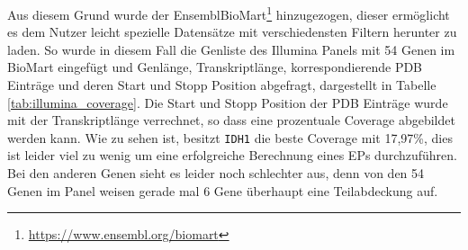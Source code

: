 Aus diesem Grund wurde der EnsemblBioMart\footnote{\url{https://www.ensembl.org/biomart}} hinzugezogen, dieser ermöglicht es dem Nutzer leicht spezielle Datensätze mit verschiedensten Filtern herunter zu laden. So wurde in diesem Fall die Genliste des Illumina Panels mit 54 Genen im BioMart eingefügt und Genlänge, Transkriptlänge, korrespondierende \ac{PDB} Einträge und deren Start und Stopp Position abgefragt, dargestellt in Tabelle \ref{tab:illumina_coverage}. Die Start und Stopp Position der \ac{PDB} Einträge wurde mit der Transkriptlänge verrechnet, so dass eine prozentuale Coverage abgebildet werden kann. Wie zu sehen ist, besitzt \texttt{IDH1} die beste Coverage mit 17,97\%, dies ist leider viel zu wenig um eine erfolgreiche Berechnung eines \ac{EP}s durchzuführen. Bei den anderen Genen sieht es leider noch schlechter aus, denn von den 54 Genen im Panel weisen gerade mal 6 Gene überhaupt eine Teilabdeckung auf. 

\begin{table}[]
    \centering
    \caption{VariantPlex Solid Tumor Kit Coverage, Transkriptlänge ist mit UTRs und CDS angegeben.}
    \label{tab:variantplex_coverage}
\end{table}

